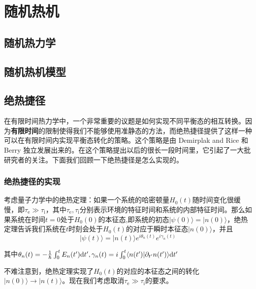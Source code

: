 \chapter{随机热机}
\section{随机热力学}

\section{随机热机模型}

\section{绝热捷径}

\qquad 在有限时间热力学中，一个非常重要的议题是如何实现不同平衡态的相互转换。因为\textbf{有限时间}的限制使得我们不能够使用准静态的方法，而绝热捷径\cite{Chen2010}提供了这样一种可以在有限时间内实现平衡态转化的策略。这个策略是由 Demirplak and Rice \cite{Demirplak2003}和 Berry \cite{Berry2009} 独立发展出来的。在这个策略提出以后的很长一段时间里，它引起了一大批研究者的关注。下面我们回顾一下绝热捷径是怎么实现的。


\subsection{绝热捷径的实现}


\qquad 考虑量子力学中的绝热定理\cite{Griffiths2018}：如果一个系统的哈密顿量$H_0(t)$随时间变化很缓慢，即$\tau_\mathrm{e} \gg \tau_\mathrm{i}$，其中$\tau_\mathrm{e}, \tau_\mathrm{i}$分别表示环境的特征时间和系统的内部特征时间。那么如果系统在时间$t=0$处于$H_0 (0)$的本征态,即系统的初态$| \psi(0) \rangle = | n(0) \rangle$，绝热定理告诉我们系统在$t$时刻会处于$H_0 (t)$的对应于瞬时本征态$| n(0) \rangle$，并且
\begin{equation}
    |\psi(t)\rangle=|n(t)\rangle e^{i \theta_{n}(t)} e^{i \gamma_{n}(t)}
    \label{eq2.1}
\end{equation}

其中$\theta_{n}(t)=-\frac{1}{\hbar} \int_{0}^{t} E_{n}(t^{\prime}) \mathrm{d} t^{\prime}, \gamma_{n}(t)=i \int_{0}^{t}\langle n(t^{\prime}) | \partial_{t^{\prime}}n(t^{\prime})\rangle \mathrm{d} t^{\prime}$

不难注意到，绝热定理实现了$H_0(t)$的对应的本征态之间的转化$| n(0) \rangle \to | n(t) \rangle$。现在我们考虑取消$\tau_\mathrm{e} \gg \tau_\mathrm{i}$的要求。

